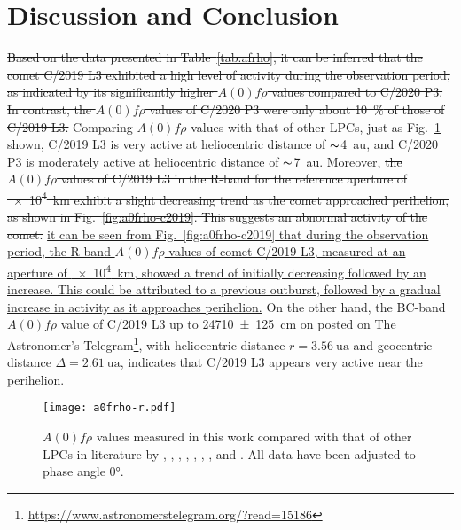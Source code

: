 \section{Discussion and Conclusion}\label{sec:dis}


\st{Based on the data presented in Table~\ref{tab:afrho}, it can be inferred that the comet C/2019 L3 exhibited a high level of activity during the observation period, as indicated by its significantly higher $A(0)f\rho$ values compared to C/2020 P3. In contrast, the $A(0)f\rho$ values of C/2020 P3 were only about {\SI{10}{\percent}} of those of C/2019 L3.} 
Comparing $A(0)f\rho$ values with that of other LPCs, just as Fig.~\ref{fig:afrho-ref} shown, C/2019 L3 is very active at heliocentric distance of $\thicksim${\qty{4}{\astronomicalunit}}, and C/2020 P3 is moderately active at heliocentric distance of $\thicksim${\qty{7}{\astronomicalunit}}. 
Moreover, \st{the $A(0)f\rho$ values of C/2019 L3 in the R-band for the reference aperture of {\SI{e4}{\km}} exhibit a slight decreasing trend as the comet approached perihelion, as shown in Fig.~\ref{fig:a0frho-c2019}. This suggests an abnormal activity of the comet.} %
\ul{it can be seen from Fig.~\ref{fig:a0frho-c2019} that during the observation period, the R-band $A(0)f\rho$ values of comet C/2019 L3, measured at an aperture of {\SI{e4}{\km}}, showed a trend of initially decreasing followed by an increase. This could be attributed to a previous outburst, followed by a gradual increase in activity as it approaches perihelion.}
On the other hand, 
the BC-band $A(0)f\rho$ value of C/2019 L3 up to \SI{24710 +- 125}{\cm} on  posted on The Astronomer's Telegram\footnote{\href{https://www.astronomerstelegram.org/?read=15186}{https://www.astronomerstelegram.org/?read=15186}}, with heliocentric distance $r = \SI{3.56}{\astronomicalunit}$ and geocentric distance $\Delta = \SI{2.61}{\astronomicalunit}$, indicates that C/2019 L3 appears very active near the perihelion. 


\begin{figure}
    \centering
    \texttt{[image: a0frho-r.pdf]}
    \caption{$A(0)f\rho$ values measured in this work compared with that of other LPCs in  literature by \citet{mazzotta_epifani_observational_2014}, \citet{garcia_photometry_2021}, \citet{garcia_observational_2020}, \citet{rousselot_monitoring_2014}, \citet{meech_activity_2009}, \citet{sarneczky_activity_2016}, \citet{solontoi_ensemble_2012}, and \citet{szabo_spectrophotometry_2002}. All data have been adjusted to phase angle \ang{0}. }\label{fig:afrho-ref}
\end{figure}%


